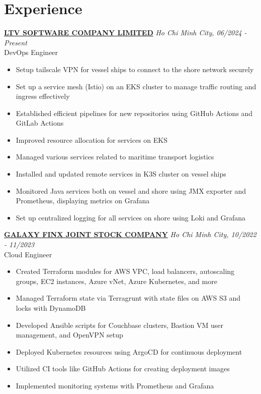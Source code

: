 \documentclass[a4paper,10pt]{article}
\begin{document}
\section*{Experience}
\noindent \textbf{\href{https://www.linkedin.com/company/ltvofficial/posts/?feedView=all}{LTV SOFTWARE COMPANY LIMITED}} \hfill \textit{Ho Chi Minh City, 06/2024 - Present}  \\
DevOps Engineer \\
\begin{itemize}
    \item Setup tailscale VPN for vessel ships to connect to the shore network securely
    \item Set up a service mesh (Istio) on an EKS cluster to manage traffic routing and ingress effectively
    \item Established efficient pipelines for new repositories using GitHub Actions and GitLab Actions
    \item Improved resource allocation for services on EKS
    \item Managed various services related to maritime transport logistics
    \item Installed and updated remote services in K3S cluster on vessel ships
    \item Monitored Java services both on vessel and shore using JMX exporter and Prometheus, displaying metrics on Grafana
    \item Set up centralized logging for all services on shore using Loki and Grafana
\end{itemize}

\vspace{10pt}
\noindent \textbf{\href{https://www.linkedin.com/company/galaxy-finx/posts/?feedView=all}{GALAXY FINX JOINT STOCK COMPANY}} \hfill \textit{Ho Chi Minh City, 10/2022 - 11/2023} \\
Cloud Engineer \\
\begin{itemize}
    \item Created Terraform modules for AWS VPC, load balancers, autoscaling groups, EC2 instances, Azure vNet, Azure Kubernetes, and more
    \item Managed Terraform state via Terragrunt with state files on AWS S3 and locks with DynamoDB
    \item Developed Ansible scripts for Couchbase clusters, Bastion VM user management, and OpenVPN setup
    \item Deployed Kubernetes resources using ArgoCD for continuous deployment
    \item Utilized CI tools like GitHub Actions for creating deployment images
    \item Implemented monitoring systems with Prometheus and Grafana
\end{itemize}
\end{document}
